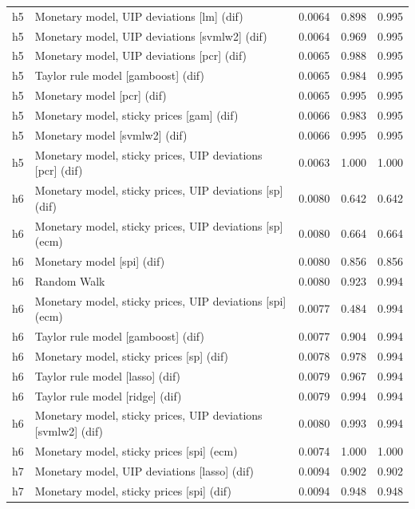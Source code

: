 \begin{ThreePartTable}
\begin{longtable}[t]{cp{5.5cm}ccc}
h5 & \raggedright Monetary model, UIP deviations [lm] (dif) & 0.0064 & 0.898 & 0.995\\
h5 & \raggedright Monetary model, UIP deviations [svmlw2] (dif) & 0.0064 & 0.969 & 0.995\\
h5 & \raggedright Monetary model, UIP deviations [pcr] (dif) & 0.0065 & 0.988 & 0.995\\
h5 & \raggedright Taylor rule model [gamboost] (dif) & 0.0065 & 0.984 & 0.995\\
h5 & \raggedright Monetary model [pcr] (dif) & 0.0065 & 0.995 & 0.995\\
h5 & \raggedright Monetary model, sticky prices [gam] (dif) & 0.0066 & 0.983 & 0.995\\
h5 & \raggedright Monetary model [svmlw2] (dif) & 0.0066 & 0.995 & 0.995\\
h5 & \raggedright Monetary model, sticky prices, UIP deviations [pcr] (dif) & 0.0063 & 1.000 & 1.000\\
\addlinespace
h6 & \raggedright Monetary model, sticky prices, UIP deviations [sp] (dif) & 0.0080 & 0.642 & 0.642\\
h6 & \raggedright Monetary model, sticky prices, UIP deviations [sp] (ecm) & 0.0080 & 0.664 & 0.664\\
h6 & \raggedright Monetary model [spi] (dif) & 0.0080 & 0.856 & 0.856\\
h6 & \raggedright Random Walk & 0.0080 & 0.923 & 0.994\\
h6 & \raggedright Monetary model, sticky prices, UIP deviations [spi] (ecm) & 0.0077 & 0.484 & 0.994\\
h6 & \raggedright Taylor rule model [gamboost] (dif) & 0.0077 & 0.904 & 0.994\\
h6 & \raggedright Monetary model, sticky prices [sp] (dif) & 0.0078 & 0.978 & 0.994\\
h6 & \raggedright Taylor rule model [lasso] (dif) & 0.0079 & 0.967 & 0.994\\
h6 & \raggedright Taylor rule model [ridge] (dif) & 0.0079 & 0.994 & 0.994\\
h6 & \raggedright Monetary model, sticky prices, UIP deviations [svmlw2] (dif) & 0.0080 & 0.993 & 0.994\\
h6 & \raggedright Monetary model, sticky prices [spi] (ecm) & 0.0074 & 1.000 & 1.000\\
\addlinespace
h7 & \raggedright Monetary model, UIP deviations [lasso] (dif) & 0.0094 & 0.902 & 0.902\\
h7 & \raggedright Monetary model, sticky prices [spi] (dif) & 0.0094 & 0.948 & 0.948\\

\end{longtable}
\end{ThreePartTable}
